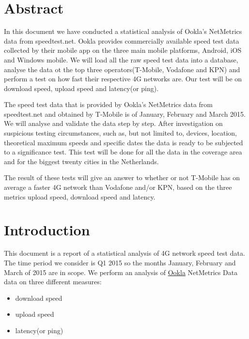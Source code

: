 \documentclass[]{article}
\begin{document}
\newpage

\section{Abstract}\label{abstract}

In this document we have conducted a statistical analysis of Ookla's
NetMetrics data from speedtest.net. Ookla provides commercially
available speed test data collected by their mobile app on the three
main mobile platforms, Android, iOS and Windows mobile. We will load all
the raw speed test data into a database, analyse the data ot the top
three operators(T-Mobile, Vodafone and KPN) and perform a test on how
fast their respective 4G networks are. Our test will be on download
speed, upload speed and latency(or ping).

The speed test data that is provided by Ookla's NetMetrics data from
speedtest.net and obtained by T-Mobile is of January, February and March
2015. We will analyse and validate the data step by step. After
investigation on suspicious testing circumstances, such as, but not
limited to, devices, location, theoretical maximum speeds and specific
dates the data is ready to be subjected to a significance test. This
test will be done for all the data in the coverage area and for the
biggest twenty cities in the Netherlands.

The result of these tests will give an answer to whether or not T-Mobile
has on average a faster 4G network than Vodafone and/or KPN, based on
the three metrics upload speed, download speed and latency.

\newpage

\section{Introduction}\label{introduction}

This document is a report of a statistical analysis of 4G network speed
test data. The time period we consider is Q1 2015 so the months January,
February and March of 2015 are in scope. We perform an analysis of
\href{http://www.ookla.com/}{Ookla} NetMetrics Data data on three
different measures:

\begin{itemize}
\itemsep1pt\parskip0pt
\item
  download speed
\item
  upload speed
\item
  latency(or ping)
\end{itemize}
\end{document}
